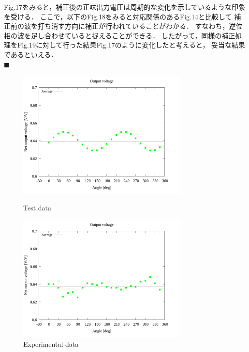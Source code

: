 \documentclass[twocolumn,a4j]{jsarticle}
\begin{document}
\newpage

Fig.17をみると，補正後の正味出力電圧は周期的な変化を示しているような印象を受ける．
ここで，以下のFig.18をみると対応関係のあるFig.14と比較して
補正前の波を打ち消す方向に補正が行われていることがわかる．
すなわち，逆位相の波を足し合わせていると捉えることができる．
したがって，同様の補正処理をFig.19に対して行った結果Fig.17のように変化したと考えると，
妥当な結果であるといえる．\\

$\blacksquare$ 

\begin{figure}[htbp]
    \footnotesize
    \begin{center}
        \includegraphics[width=86mm]{../graphes/simulation_1/05/05_summary-outputvoltage.png}
        \caption{Test data}
        \includegraphics[width=86mm]{../graphes/1-ex/05/05_summary-outputvoltage.png}
        \caption{Experimental data}
    \end{center}
\end{figure}
\end{document}

